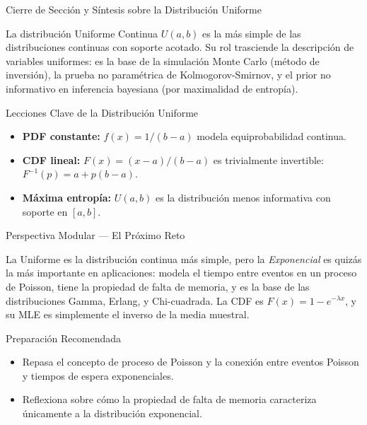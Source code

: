 \documentclass[10pt, aspectratio=169]{beamer}
\begin{document}
\begin{frame}{Cierre de Sección y Síntesis sobre la Distribución Uniforme}
  \begin{reflexion}
    La distribución Uniforme Continua $U(a, b)$ es la más simple de las distribuciones continuas con soporte acotado. Su rol trasciende la descripción de variables uniformes: es la base de la simulación Monte Carlo (método de inversión), la prueba no paramétrica de Kolmogorov-Smirnov, y el prior no informativo en inferencia bayesiana (por maximalidad de entropía).
  \end{reflexion}

  \vspace{0.2cm}
  \pause
  \begin{block}{Lecciones Clave de la Distribución Uniforme}
    \begin{itemize}\itemsep=0.08cm
      \item \textbf{PDF constante:} $f(x) = 1/(b-a)$ modela equiprobabilidad continua.
      \item \textbf{CDF lineal:} $F(x) = (x-a)/(b-a)$ es trivialmente invertible: $F^{-1}(p) = a + p(b-a)$.
      \item \textbf{Máxima entropía:} $U(a, b)$ es la distribución menos informativa con soporte en $[a, b]$.
    \end{itemize}
  \end{block}
\end{frame}

\begin{frame}{Perspectiva Modular --- El Próximo Reto}
  \scriptsize
  \begin{retoclase}
    La Uniforme es la distribución continua más simple, pero la \emph{Exponencial} es quizás la más importante en aplicaciones: modela el tiempo entre eventos en un proceso de Poisson, tiene la propiedad de falta de memoria, y es la base de las distribuciones Gamma, Erlang, y Chi-cuadrada. La CDF es $F(x) = 1 - e^{-\lambda x}$, y su MLE es simplemente el inverso de la media muestral.
  \end{retoclase}

  \vspace{0.08cm}
  \pause
  \begin{alertblock}{Preparación Recomendada}
    \begin{itemize}\itemsep=0.06cm
      \item Repasa el concepto de proceso de Poisson y la conexión entre eventos Poisson y tiempos de espera exponenciales.
      \item Reflexiona sobre cómo la propiedad de falta de memoria caracteriza únicamente a la distribución exponencial.
    \end{itemize}
  \end{alertblock}
\end{frame}
\end{document}
